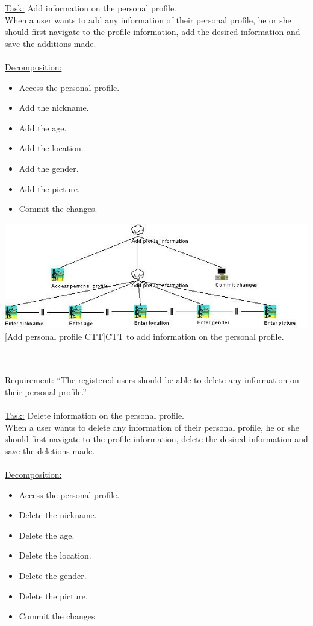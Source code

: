 \documentclass[11pt, a4paper,svglistings,oneside]{book}
\begin{document}
\underline{Task:} Add information on the personal profile. \\
When a user wants to add any information of their personal profile, he or she should first navigate to the profile information, add the desired information and save the additions made. \\ \\
\underline{Decomposition:}
\begin{itemize}
\item Access the personal profile.
\item Add the nickname.
\item Add the age.
\item Add the location.
\item Add the gender.
\item Add the picture.
\item Commit the changes.
\end{itemize}
\noindent\begin{minipage}{\textwidth}
    \centering
   \includegraphics[width=\textwidth]{CTT_Add.png}
 [Add personal profile CTT]{CTT to add information on the personal profile.}
\end{minipage}
$\;$ \\ \\
\underline{Requirement:} ``The registered users should be able to delete any information on their personal profile.'' \\ \\
\underline{Task:} Delete information on the personal profile. \\
When a user wants to delete any information of their personal profile, he or she should first navigate to the profile information, delete the desired information and save the deletions made. \\ \\
\underline{Decomposition:}
\begin{itemize}
\item Access the personal profile.
\item Delete the nickname.
\item Delete the age.
\item Delete the location.
\item Delete the gender.
\item Delete the picture.
\item Commit the changes. 
\end{itemize}
\end{document}
